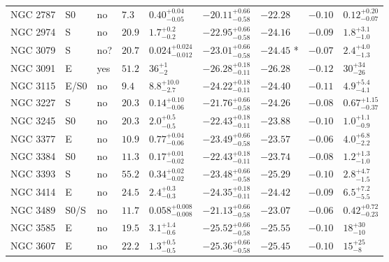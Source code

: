\begin{table*}
\begin{center}
\begin{tabular}{lllllllll}
NGC 2787  &  S0  &  no   &  $7.3$  &  $0.40_{-0.05}^{+0.04}$   &  $-20.11_{-0.58}^{+0.66}$   &  $-22.28$   &  $-0.10$  &  $0.12_{-0.07}^{+0.20}$   \\ 
NGC 2974  &  S  &  no   &  $20.9$  &  $1.7_{-0.2}^{+0.2}$   &  $-22.95_{-0.58}^{+0.66}$   &  $-24.16$   &  $-0.09$  &  $1.8_{-1.0}^{+3.1}$   \\ 
NGC 3079  &  S  &  no?  &  $20.7$  &  $0.024_{-0.012}^{+0.024}$   &  $-23.01_{-0.58}^{+0.66}$   &  $-24.45$  *  &  $-0.07$  &  $2.4_{-1.3}^{+4.0}$   \\ 
NGC 3091  &  E  &  yes   &  $51.2$  &  $36_{-2}^{+1}$   &  $-26.28_{-0.11}^{+0.18}$   &  $-26.28$   &  $-0.12$  &  $30_{-26}^{+34}$   \\ 
NGC 3115  &  E/S0  &  no   &  $9.4$  &  $8.8_{-2.7}^{+10.0}$   &  $-24.22_{-0.11}^{+0.18}$   &  $-24.40$   &  $-0.11$  &  $4.9_{-4.1}^{+5.4}$   \\ 
NGC 3227  &  S  &  no   &  $20.3$  &  $0.14_{-0.06}^{+0.10}$   &  $-21.76_{-0.58}^{+0.66}$   &  $-24.26$   &  $-0.08$  &  $0.67_{-0.37}^{+1.15}$   \\ 
NGC 3245  &  S0  &  no   &  $20.3$  &  $2.0_{-0.5}^{+0.5}$   &  $-22.43_{-0.11}^{+0.18}$   &  $-23.88$   &  $-0.10$  &  $1.0_{-0.9}^{+1.1}$   \\ 
NGC 3377  &  E  &  no   &  $10.9$  &  $0.77_{-0.06}^{+0.04}$   &  $-23.49_{-0.58}^{+0.66}$   &  $-23.57$   &  $-0.06$  &  $4.0_{-2.2}^{+6.8}$   \\ 
NGC 3384  &  S0  &  no   &  $11.3$  &  $0.17_{-0.02}^{+0.01}$   &  $-22.43_{-0.11}^{+0.18}$   &  $-23.74$   &  $-0.08$  &  $1.2_{-1.0}^{+1.3}$   \\ 
NGC 3393  &  S  &  no   &  $55.2$  &  $0.34_{-0.02}^{+0.02}$   &  $-23.48_{-0.58}^{+0.66}$   &  $-25.29$   &  $-0.10$  &  $2.8_{-1.5}^{+4.7}$   \\ 
NGC 3414  &  E  &  no   &  $24.5$  &  $2.4_{-0.3}^{+0.3}$   &  $-24.35_{-0.11}^{+0.18}$   &  $-24.42$   &  $-0.09$  &  $6.5_{-5.5}^{+7.2}$   \\ 
NGC 3489  &  S0/S  &  no   &  $11.7$  &  $0.058_{-0.008}^{+0.008}$   &  $-21.13_{-0.58}^{+0.66}$   &  $-23.07$   &  $-0.06$  &  $0.42_{-0.23}^{+0.72}$   \\ 
NGC 3585  &  E  &  no   &  $19.5$  &  $3.1_{-0.6}^{+1.4}$   &  $-25.52_{-0.58}^{+0.66}$   &  $-25.55$   &  $-0.10$  &  $18_{-10}^{+30}$   \\ 
NGC 3607  &  E  &  no   &  $22.2$  &  $1.3_{-0.5}^{+0.5}$   &  $-25.36_{-0.58}^{+0.66}$   &  $-25.45$   &  $-0.10$  &  $15_{-8}^{+25}$   \\ 

\end{tabular}
\end{center}
\end{table*}

